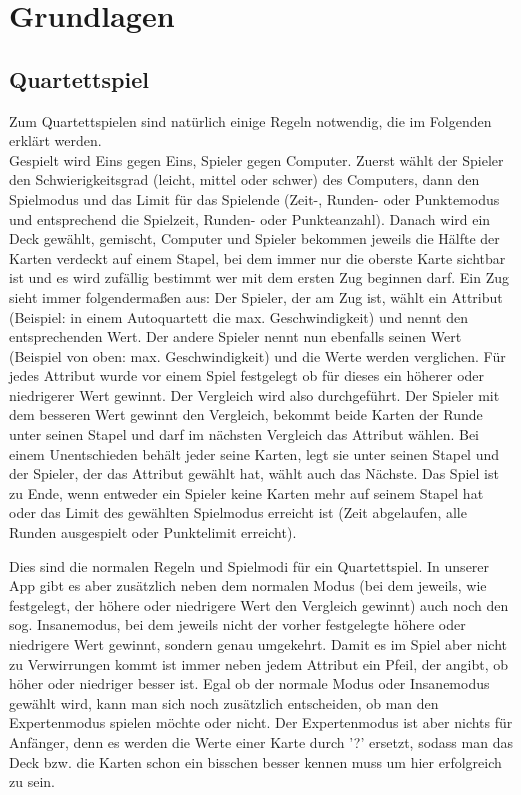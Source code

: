 \chapter{Grundlagen}
\label{cha:grundlagen}

\section{Quartettspiel}
\label{sec:grundlagen:quartettspiel}

Zum Quartettspielen sind natürlich einige Regeln notwendig, die im Folgenden erklärt werden. \\
Gespielt wird Eins gegen Eins, Spieler gegen Computer. Zuerst wählt der Spieler den Schwierigkeitsgrad (leicht, mittel oder schwer) des Computers, dann den Spielmodus und das Limit für das Spielende (Zeit-, Runden- oder Punktemodus und entsprechend die Spielzeit, Runden- oder Punkteanzahl). Danach wird ein Deck gewählt, gemischt, Computer und Spieler bekommen jeweils die Hälfte der Karten verdeckt auf einem Stapel, bei dem immer nur die oberste Karte sichtbar ist und es wird zufällig bestimmt wer mit dem ersten Zug beginnen darf. Ein Zug sieht immer folgendermaßen aus: Der Spieler, der am Zug ist, wählt ein Attribut (Beispiel: in einem Autoquartett die max. Geschwindigkeit) und nennt den entsprechenden Wert. Der andere Spieler nennt nun ebenfalls seinen Wert (Beispiel von oben: max. Geschwindigkeit) und die Werte werden verglichen. Für jedes Attribut wurde vor einem Spiel festgelegt ob für dieses ein höherer oder niedrigerer Wert gewinnt. Der Vergleich wird also durchgeführt. Der Spieler mit dem besseren Wert gewinnt den Vergleich, bekommt beide Karten der Runde unter seinen Stapel und darf im nächsten Vergleich das Attribut wählen. Bei einem Unentschieden behält jeder seine Karten, legt sie unter seinen Stapel und der Spieler, der das Attribut gewählt hat, wählt auch das Nächste. Das Spiel ist zu Ende, wenn entweder ein Spieler keine Karten mehr auf seinem Stapel hat oder das Limit des gewählten Spielmodus erreicht ist (Zeit abgelaufen, alle Runden ausgespielt oder Punktelimit erreicht).

Dies sind die normalen Regeln und Spielmodi für ein Quartettspiel. In unserer App gibt es aber zusätzlich neben dem normalen Modus (bei dem jeweils, wie festgelegt, der höhere oder niedrigere Wert den Vergleich gewinnt) auch noch den sog. Insanemodus, bei dem jeweils nicht der vorher festgelegte höhere oder niedrigere Wert gewinnt, sondern genau umgekehrt. Damit es im Spiel aber nicht zu Verwirrungen kommt ist immer neben jedem Attribut ein Pfeil, der angibt, ob höher oder niedriger besser ist. 
Egal ob der normale Modus oder Insanemodus gewählt wird, kann man sich noch zusätzlich entscheiden, ob man den Expertenmodus spielen möchte oder nicht. Der Expertenmodus ist aber nichts für Anfänger, denn es werden die Werte einer Karte durch '?' ersetzt, sodass man das Deck bzw. die Karten schon ein bisschen besser kennen muss um hier erfolgreich zu sein.


